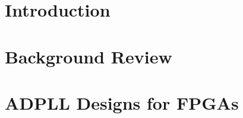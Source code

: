\documentclass[11pt,british]{report}
\begin{document}
\clearpage


\setcounter{page}{1} 
	
\pagestyle{fancy}

\fancyhead{} 

\fancyhead[LE,RO]{\slshape \nouppercase{\rightmark}} 

\fancyhead[LO,RE]{\slshape \nouppercase{\leftmark}}

\setcounter{chapter}{0}

\chapter{Introduction}\label{chap:1}


\setcounter{chapter}{1}

\chapter{Background Review}\label{chap:2}



\setcounter{chapter}{2}

\chapter{ADPLL Designs for FPGAs}\label{chap:3}



\setcounter{chapter}{2}
%
%
%
%
\pagebreak{}
{}
\fancyhead[LO,RE]{\slshape \nouppercase{\leftmark}}

\end{document}
